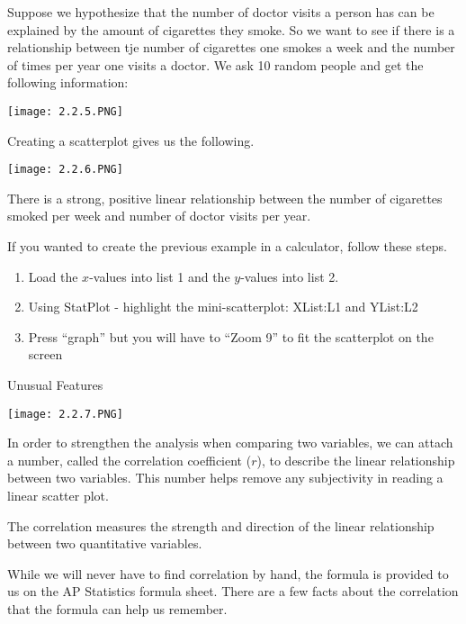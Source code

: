 \documentclass[../stats.tex]{subfiles}
\begin{document}
\begin{example}
    Suppose we hypothesize that the number of doctor visits a person has can be explained by the amount of cigarettes they smoke.
    So we want to see if there is a relationship between tje number of cigarettes one smokes a week and the number of times per year one visits a doctor.
    We ask 10 random people and get the following information: 
    \begin{center}
        \texttt{[image: 2.2.5.PNG]}
    \end{center}
    Creating a scatterplot gives us the following.
    \begin{center}
        \texttt{[image: 2.2.6.PNG]}
    \end{center}

    There is a strong, positive linear relationship between the number of cigarettes smoked per week and number of doctor visits per year.
\end{example}

If you wanted to create the previous example in a calculator, follow these steps.
\begin{enumerate}
    \item Load the $x$-values into list 1 and the $y$-values into list 2.
    \item Using StatPlot - highlight the mini-scatterplot: XList:L1 and YList:L2 
    \item Press ``graph'' but you will have to ``Zoom 9'' to fit the scatterplot on the screen 
\end{enumerate}

Unusual Features
\begin{center}
    \texttt{[image: 2.2.7.PNG]}
\end{center}

In order to strengthen the analysis when comparing two variables, we can attach a number, called the correlation coefficient ($r$), to describe the linear relationship between two variables. This number helps remove any subjectivity in reading a linear scatter plot.

The correlation measures the strength and direction of the linear relationship between two quantitative variables.

While we will never have to find correlation by hand, the formula is provided to us on the AP Statistics formula sheet. There are a few facts about the correlation that the formula can help us remember.
\end{document}
